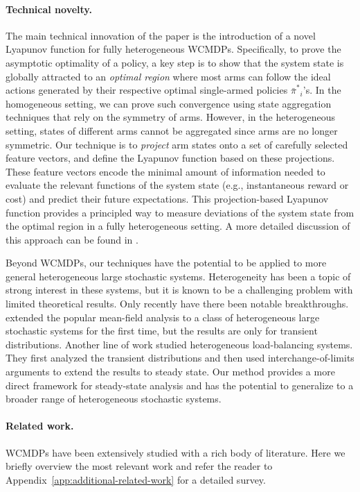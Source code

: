 \documentclass{article}
\theoremstyle{plain}
\theoremstyle{remark}
\newcommand{\pibar}{{\sysbar{\pi}}}
\newcommand{\pibs}{{\pibar^*}}
\newcommand{\sysbar}[1]{\bar{#1}}
\begin{document}
\paragraph{Technical novelty.}
The main technical innovation of the paper is the introduction of a novel Lyapunov function for fully heterogeneous WCMDPs. 
Specifically, to prove the asymptotic optimality of a policy, a key step is to show that the system state is globally attracted to an \emph{optimal region} where most arms can follow the ideal actions generated by their respective optimal single-armed policies $\pibs_i$'s. 
In the homogeneous setting, we can prove such convergence using state aggregation techniques that rely on the symmetry of arms.
However, in the heterogeneous setting, states of different arms cannot be aggregated since arms are no longer symmetric.
Our technique is to \emph{project} arm states onto a set of carefully selected feature vectors, and define the Lyapunov function based on these projections. 
These feature vectors encode the minimal amount of information needed to evaluate the relevant functions of the system state (e.g., instantaneous reward or cost) and predict their future expectations.  
This projection-based Lyapunov function provides a principled way to measure deviations of the system state from the optimal region in a fully heterogeneous setting. 
A more detailed discussion of this approach can be found in . 


Beyond WCMDPs, our techniques have the potential to be applied to more general heterogeneous large stochastic systems.
Heterogeneity has been a topic of strong interest in these systems, but it is known to be a challenging problem with limited theoretical results.
Only recently have there been notable breakthroughs.
\citep{AllGas22_het,AllGas22_graphon} extended the popular mean-field analysis to a class of heterogeneous large stochastic systems for the first time, but the results are only for transient distributions.
Another line of work \citep{ZhaMukWu_24_data_loc_het,ZhaMuk_24_rate_mat_prun} studied heterogeneous load-balancing systems.
They first analyzed the transient distributions and then used interchange-of-limits arguments to extend the results to steady state.
Our method provides a more direct framework for steady-state analysis and has the potential to generalize to a broader range of heterogeneous stochastic systems.


\paragraph{Related work.}
WCMDPs have been extensively studied with a rich body of literature.
Here we briefly overview the most relevant work and refer the reader to Appendix~\ref{app:additional-related-work} for a detailed survey.
\end{document}
